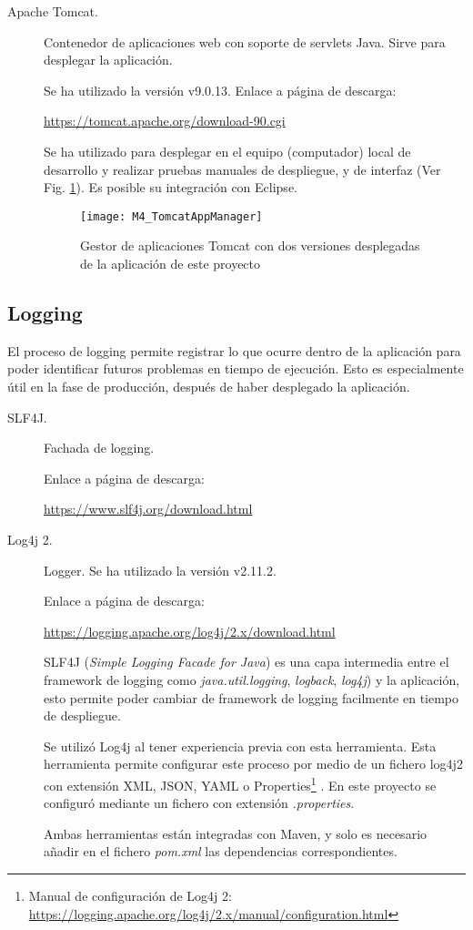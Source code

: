\begin{description}
	\item[Apache Tomcat.] Contenedor de aplicaciones web con soporte de servlets Java. Sirve para desplegar la aplicación.
	
		Se ha utilizado la versión  v9.0.13. Enlace a página de descarga:
		
		\url{https://tomcat.apache.org/download-90.cgi}
		
		Se ha utilizado para desplegar en el equipo (computador) local de desarrollo y realizar pruebas manuales de despliegue, y de interfaz (Ver Fig. \ref{fig:M4_TomcatAppManager}). Es posible su integración con Eclipse.
		
		\begin{figure}[!h]
			\centering
			\texttt{[image: M4\_TomcatAppManager]}
			\caption{Gestor de aplicaciones Tomcat con dos versiones desplegadas de la aplicación de este proyecto}\label{fig:M4_TomcatAppManager}
		\end{figure}
		\FloatBarrier
		
\end{description}
\subsection{Logging}
El proceso de logging permite registrar lo que ocurre dentro de la aplicación para poder identificar futuros problemas en tiempo de ejecución. Esto es especialmente útil en la fase de producción, después de haber desplegado la aplicación.
\begin{description}
	\item[SLF4J.] Fachada de logging.
	
		Enlace a página de descarga:
	
		\url{https://www.slf4j.org/download.html}
	
	\item[Log4j 2.] Logger. Se ha utilizado la versión  v2.11.2.
	
	 	Enlace a página de descarga:
	
	 	\url{https://logging.apache.org/log4j/2.x/download.html}
	
		SLF4J (\textit{Simple Logging Facade for Java}) es una capa intermedia entre el framework de logging como \textit{java.util.logging}, \textit{logback}, \textit{log4j}) y la aplicación, esto permite poder cambiar de framework de logging facilmente en tiempo de despliegue.
		
		Se utilizó Log4j al tener experiencia previa con esta herramienta. Esta herramienta permite configurar este proceso por medio de un fichero log4j2 con extensión XML, JSON, YAML o Properties\footnote{Manual de configuración de Log4j 2: \url{https://logging.apache.org/log4j/2.x/manual/configuration.html}} \cite{noauthor_log4j_nodate}. En este proyecto se configuró mediante un fichero con extensión \textit{.properties}. 
		
		Ambas herramientas están integradas con Maven, y solo es necesario añadir en el fichero \textit{pom.xml} las dependencias correspondientes.
	
\end{description}
